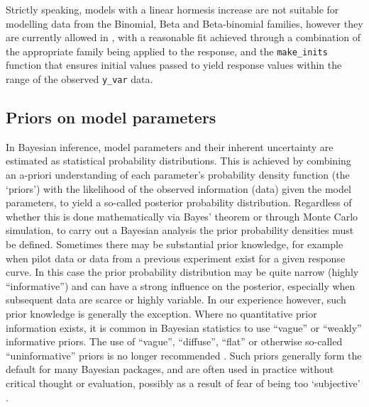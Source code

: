 \documentclass[
]{jss}
\begin{document}
Strictly speaking, models with a linear hormesis increase are not
suitable for modelling data from the Binomial, Beta and Beta-binomial
families, however they are currently allowed in , with a
reasonable fit achieved through a combination of the appropriate family
being applied to the response, and the 
\texttt{make\_inits} function that ensures initial values passed to
 yield response values within the range of the observed
\texttt{y\_var} data.

\hypertarget{priors-on-model-parameters}{%
\subsection{Priors on model
parameters}\label{priors-on-model-parameters}}

In Bayesian inference, model parameters and their inherent uncertainty
are estimated as statistical probability distributions. This is achieved
by combining an a-priori understanding of each parameter's probability
density function (the `priors') with the likelihood of the observed
information (data) given the model parameters, to yield a so-called
posterior probability distribution. Regardless of whether this is done
mathematically via Bayes' theorem or through Monte Carlo simulation, to
carry out a Bayesian analysis the prior probability densities must be
defined. Sometimes there may be substantial prior knowledge, for example
when pilot data or data from a previous experiment exist for a given
response curve. In this case the prior probability distribution may be
quite narrow (highly ``informative'') and can have a strong influence on
the posterior, especially when subsequent data are scarce or highly
variable. In our experience however, such prior knowledge is generally
the exception. Where no quantitative prior information exists, it is
common in Bayesian statistics to use ``vague'' or ``weakly'' informative
priors. The use of ``vague'', ``diffuse'', ``flat'' or otherwise
so-called ``uninformative'' priors is no longer recommended
\citep{Banner2020}. Such priors generally form the default for many
Bayesian packages, and are often used in practice without critical
thought or evaluation, possibly as a result of fear of being too
`subjective' \citep{Banner2020}.
\end{document}
